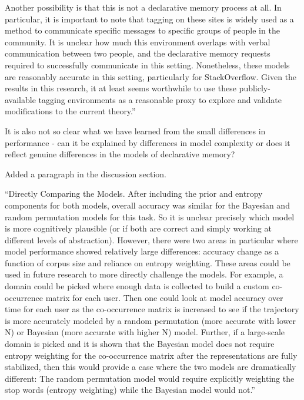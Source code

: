 \documentclass[answers,12pt]{exam}
\begin{document}
\begin{questions}
\begin{solution}
Another possibility is that this is not a declarative memory process at all. In particular, it is important to note that tagging on these sites is widely used as a method to communicate specific messages to specific groups of people in the community. It is unclear how much this environment overlaps with verbal communication between two people, and the declarative memory requests required to successfully communicate in this setting. Nonetheless, these models are reasonably accurate in this setting, particularly for StackOverflow. Given the results in this research, it at least seems worthwhile to use these publicly-available tagging environments as a reasonable proxy to explore and validate modifications to the current theory.''

\end{solution}

\question It is also not so clear what we have learned from the small differences in performance - can it be explained by differences in model complexity or does it reflect genuine differences in the models of declarative memory?

\begin{solution}
Added a paragraph in the discussion section.

``Directly Comparing the Models. After including the prior and entropy components for both models, overall accuracy was similar for the Bayesian and random permutation models for this task. So it is unclear precisely which model is more cognitively plausible (or if both are correct and simply working at different levels of abstraction). However, there were two areas in particular where model performance showed relatively large differences: accuracy change as a function of corpus size and reliance on entropy weighting. These areas could be used in future research to more directly challenge the models. For example, a domain could be picked where enough data is collected to build a custom co-occurrence matrix for each user. Then one could look at model accuracy over time for each user as the co-occurrence matrix is increased to see if the trajectory is more accurately modeled by a random permutation (more accurate with lower N) or Bayesian (more accurate with higher N) model. Further, if a large-scale domain is picked and it is shown that the Bayesian model does not require entropy weighting for the co-occurrence matrix after the representations are fully stabilized, then this would provide a case where the two models are dramatically different: The random permutation model would require explicitly weighting the stop words (entropy weighting) while the Bayesian model would not.''


\end{solution}
\end{questions}
\end{document}
